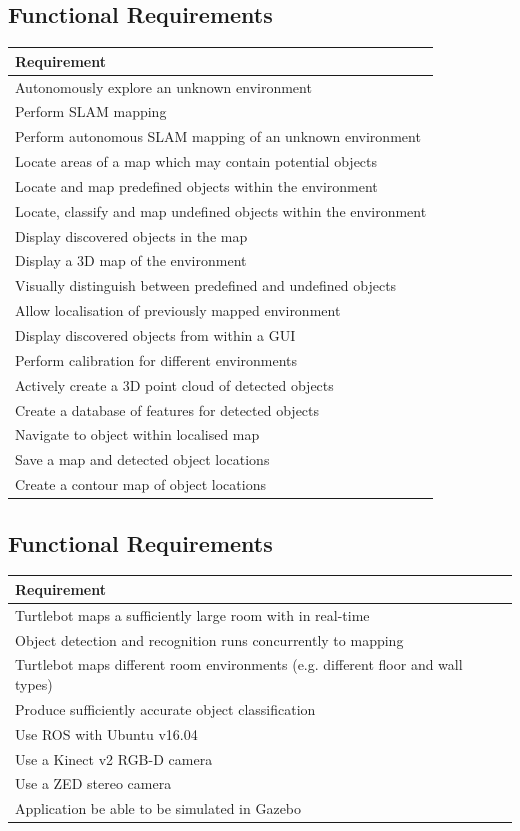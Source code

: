 \documentclass{mproj}
\begin{document}
\subsection{Functional Requirements}



\begin{tabular}{l}
\hline
 \rowcolor{gray!50}Requirement\\
 \hline
Autonomously explore an unknown environment \\
Perform SLAM mapping\\
Perform autonomous SLAM mapping of an unknown environment\\
Locate areas of a map which may contain potential objects\\
Locate and map predefined objects within the environment\\
Locate, classify and map undefined objects within the environment\\
Display discovered objects in the map\\
Display a 3D map of the environment\\
Visually distinguish between predefined and undefined objects\\
Allow localisation of previously mapped environment\\
Display discovered objects from within a GUI\\
Perform calibration for different environments\\
Actively create a 3D point cloud of detected objects\\
Create a database of features for detected objects\\
Navigate to object within localised map \\
Save a map and detected object locations\\
Create a contour map of object locations\\			  
\bottomrule
\hline
\end{tabular}

\subsection{Functional Requirements}

\begin{tabular}{l}
\hline
 \rowcolor{gray!50}Requirement\\
 \hline
Turtlebot maps a sufficiently large room with in real-time\\
Object detection and recognition runs concurrently to mapping\\
Turtlebot maps different room environments (e.g. different floor and wall types)\\
Produce sufficiently accurate object classification	\\
Use ROS with Ubuntu v16.04\\
Use a Kinect v2 RGB-D camera\\
Use a ZED stereo camera\\
Application be able to be simulated in Gazebo\\ 
\bottomrule
\hline
\end{tabular}
\end{document}
